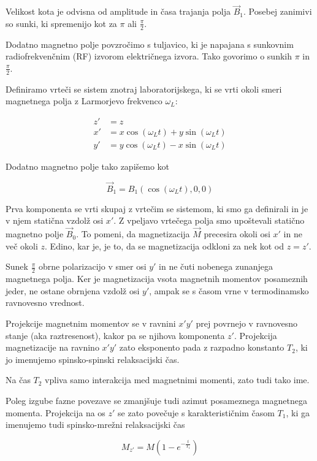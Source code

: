 \documentclass[11pt]{article}
\begin{document}
Velikost kota je odvisna od amplitude in časa trajanja polja \(\vec{B}_1\). Posebej zanimivi so sunki, ki spremenijo kot za \(\pi\) ali \(\frac{\pi}{2}\).

Dodatno magnetno polje povzročimo s tuljavico, ki je napajana s sunkovnim radiofrekvenčnim (RF) izvorom električnega izvora. Tako govorimo o sunkih \(\pi\) in \(\frac{\pi}{2}\).

Definiramo vrteči se sistem znotraj laboratorijskega, ki se vrti okoli smeri magnetnega polja z Larmorjevo frekvenco \(\omega_L\):

\begin{align*}
  z ' &= z \\
x' &= x \cos \left( \omega_L t \right) + y \sin \left( \omega_L t \right) \\
y' &= y \cos \left( \omega_L t \right) - x \sin \left( \omega_L t \right)
\end{align*}

Dodatno magnetno polje tako zapišemo kot

\[ \vec{B}_1 = B_1 (\cos \left( \omega_L t \right), 0, 0)
\]

Prva komponenta se vrti skupaj z vrtečim se sistemom, ki smo ga definirali in je v njem statična vzdolž osi \(x'\). Z vpeljavo vrtečega polja smo upoštevali statično magnetno polje \(\vec{B}_0\). To pomeni, da magnetizacija \(\vec{M}\) precesira okoli osi \(x'\) in ne več okoli \(z\). Edino, kar je, je to, da se magnetizacija odkloni za nek kot od \(z = z'\).

Sunek \(\frac{\pi}{2}\) obrne polarizacijo v smer osi \(y'\) in ne čuti nobenega zunanjega magnetnega polja. Ker je magnetizacija vsota magnetnih momentov posameznih jeder, ne ostane obrnjena vzdolž osi \(y'\), ampak se s časom vrne v termodinamsko ravnovesno vrednost.

Projekcije magnetnim momentov se v ravnini \(x'y'\) prej povrnejo v ravnovesno stanje (aka raztresenost), kakor pa se njihova komponenta \(z'\). Projekcija magnetizacije na ravnino \(x'y'\) zato eksponento pada z razpadno konstanto \(T_2\), ki jo imenujemo spinsko-spinski relaksacijski čas.

Na čas \(T_2\) vpliva samo interakcija med magnetnimi momenti, zato tudi tako ime.

Poleg izgube fazne povezave se zmanjšuje tudi azimut posameznega magnetnega momenta. Projekcija na os \(z'\) se zato povečuje s karakterističnim časom \(T_1\), ki ga imenujemo tudi spinsko-mrežni relaksacijski čas

\begin{equation}
\label{eq:6}
M_{z'} = M(1 - e^{-\frac{t}{T_1}})
\end{equation}
\end{document}
